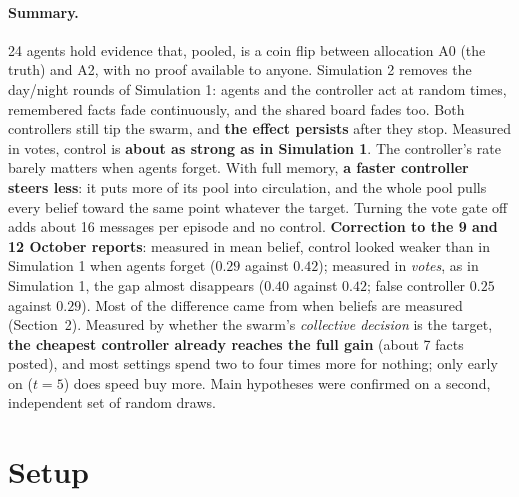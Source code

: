 \documentclass[10pt,a4paper]{article}
\begin{document}
\paragraph{Summary.} 24 agents hold evidence that, pooled, is a coin flip between allocation
A0 (the truth) and A2, with no proof available to anyone. Simulation 2 removes the day/night
rounds of Simulation 1: agents and the controller act at random times, remembered facts fade
continuously, and the shared board fades too. Both controllers still tip the swarm, and
\textbf{the effect persists} after they stop. Measured in votes, control
is \textbf{about as strong as in Simulation 1}. The controller's rate barely matters when agents
forget. With full memory, \textbf{a faster controller steers less}: it puts more of its pool
into circulation, and the whole pool pulls every belief toward the same point whatever the
target. Turning the vote gate off adds about 16 messages per episode and no control.
\textbf{Correction to the 9 and 12 October reports}: measured in mean belief, control looked weaker
than in Simulation 1 when agents forget ($0.29$ against $0.42$); measured in \emph{votes}, as in
Simulation 1, the gap almost disappears ($0.40$ against $0.42$; false controller $0.25$ against
$0.29$). Most of the difference came from when beliefs are measured (Section~2).
Measured by whether the swarm's \emph{collective decision} is the target, \textbf{the cheapest
controller already reaches the full gain} (about 7 facts posted), and most settings spend two to
four times more for nothing; only early on ($t = 5$) does speed buy more.
Main hypotheses were confirmed on a second, independent set of random draws.

\section{Setup}
\end{document}
